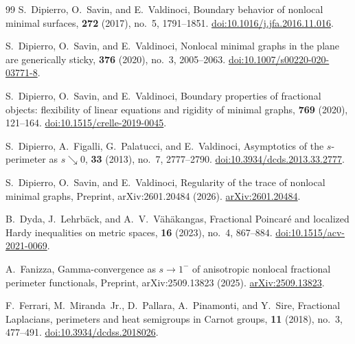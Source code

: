 \documentclass[reqno,11pt]{amsart}
\numberwithin{equation}{section}
\theoremstyle{definition} %
\theoremstyle{plain}
\theoremstyle{definition}
\theoremstyle{remark}
\begin{document}
\begin{thebibliography}{99}
S.~Dipierro, O.~Savin, and E.~Valdinoci,
\newblock Boundary behavior of nonlocal minimal surfaces,
 \textbf{272} (2017), no.~5, 1791--1851.
\newblock \href{https://doi.org/10.1016/j.jfa.2016.11.016}{doi:10.1016/j.jfa.2016.11.016}.

S.~Dipierro, O.~Savin, and E.~Valdinoci,
\newblock Nonlocal minimal graphs in the plane are generically sticky,
 \textbf{376} (2020), no.~3, 2005--2063.
\newblock \href{https://doi.org/10.1007/s00220-020-03771-8}{doi:10.1007/s00220-020-03771-8}.

S.~Dipierro, O.~Savin, and E.~Valdinoci,
\newblock Boundary properties of fractional objects: flexibility of linear equations and rigidity of minimal graphs,
 \textbf{769} (2020), 121--164.
\newblock \href{https://doi.org/10.1515/crelle-2019-0045}{doi:10.1515/crelle-2019-0045}.

S.~Dipierro, A.~Figalli, G.~Palatucci, and E.~Valdinoci,
\newblock Asymptotics of the $s$-perimeter as $s\searrow 0$,
 \textbf{33} (2013), no.~7, 2777--2790.
\newblock \href{https://doi.org/10.3934/dcds.2013.33.2777}{doi:10.3934/dcds.2013.33.2777}.

S.~Dipierro, O.~Savin, and E.~Valdinoci,
\newblock Regularity of the trace of nonlocal minimal graphs,
\newblock Preprint, arXiv:2601.20484 (2026).
\newblock \href{https://arxiv.org/abs/2601.20484}{arXiv:2601.20484}.

B.~Dyda, J.~Lehrb{\"a}ck, and A.~V.~V{\"a}h{\"a}kangas,
\newblock Fractional {P}oincar{\'e} and localized {H}ardy inequalities on metric spaces,
 \textbf{16} (2023), no.~4, 867--884.
\newblock \href{https://doi.org/10.1515/acv-2021-0069}{doi:10.1515/acv-2021-0069}.

A.~Fanizza,
\newblock Gamma-convergence as $s\to1^-$ of anisotropic nonlocal fractional perimeter functionals,
\newblock Preprint, arXiv:2509.13823 (2025).
\newblock \href{https://arxiv.org/abs/2509.13823}{arXiv:2509.13823}.

F.~Ferrari, M.~Miranda~Jr., D.~Pallara, A.~Pinamonti, and Y.~Sire,
\newblock Fractional {L}aplacians, perimeters and heat semigroups in {C}arnot groups,
 \textbf{11} (2018), no.~3, 477--491.
\newblock \href{https://doi.org/10.3934/dcdss.2018026}{doi:10.3934/dcdss.2018026}.


\end{thebibliography}
\end{document}
